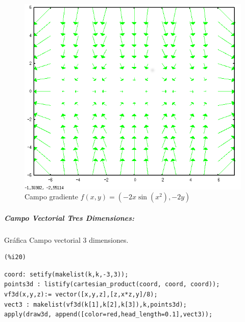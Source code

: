 \documentclass[12pt]{article}
\begin{document}
\begin{figure}[H]
\centering
\includegraphics[scale=0.5]{10.png}
\caption{Campo gradiente  $f(x,y)= (-2x\sin(x^2),-2y)$ }
\end{figure}


\subparagraph{Campo Vectorial Tres Dimensiones:}
Gráfica Campo vectorial 3 dimensiones.

\noindent
\begin{minipage}[t]{8ex}{\color{red}\bf
\begin{verbatim}
(%i20) 
\end{verbatim}}
\end{minipage}
\begin{minipage}[t]{\textwidth}{\color{blue}
\begin{verbatim}
coord: setify(makelist(k,k,-3,3));
points3d : listify(cartesian_product(coord, coord, coord));
vf3d(x,y,z):= vector([x,y,z],[z,x*z,y]/8);
vect3 : makelist(vf3d(k[1],k[2],k[3]),k,points3d);
apply(draw3d, append([color=red,head_length=0.1],vect3));
\end{verbatim}}
\end{minipage}
\end{document}
